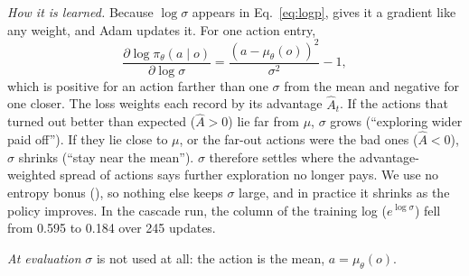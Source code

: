 \emph{How it is learned.} Because $\log\sigma$ appears in
Eq.~\eqref{eq:logp},  gives it a gradient like any
weight, and Adam updates it. For one action entry,
\begin{equation}
\frac{\partial\log\pi_\theta(a\mid o)}{\partial\log\sigma}
  =\frac{(a-\mu_\theta(o))^2}{\sigma^2}-1 ,
\label{eq:dlogsigma}
\end{equation}
which is positive for an action farther than one $\sigma$ from the mean and
negative for one closer. The loss weights each record by its advantage
$\hat A_t$. If the actions that turned out better than expected
($\hat A>0$) lie far from $\mu$, $\sigma$ grows (``exploring wider paid
off''). If they lie close to $\mu$, or the far-out actions were the bad
ones ($\hat A<0$), $\sigma$ shrinks (``stay near the mean''). $\sigma$
therefore settles where the advantage-weighted spread of actions says
further exploration no longer pays. We use no entropy bonus
(), so nothing else keeps $\sigma$ large, and in practice it shrinks
as the policy improves. In the cascade run, the  column of the
training log ($e^{\log\sigma}$) fell from 0.595 to 0.184 over 245 updates.

\emph{At evaluation} $\sigma$ is not used at all: the action is the mean,
$a=\mu_\theta(o)$.

